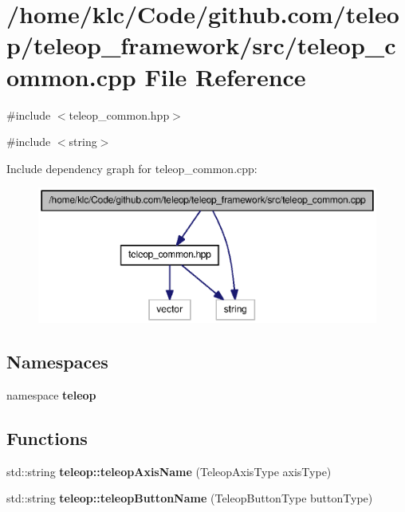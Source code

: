 \section{/home/klc/Code/github.com/teleop/teleop\_\-framework/src/teleop\_\-common.cpp File Reference}
\label{teleop__common_8cpp}
{\ttfamily \#include $<$teleop\_\-common.hpp$>$}\par
{\ttfamily \#include $<$string$>$}\par
Include dependency graph for teleop\_\-common.cpp:
\nopagebreak
\begin{figure}[H]
\begin{center}
\leavevmode
\includegraphics[width=396pt]{teleop__common_8cpp__incl}
\end{center}
\end{figure}
\subsection*{Namespaces}
\begin{DoxyCompactItemize}
\item 
namespace {\bf teleop}
\end{DoxyCompactItemize}
\subsection*{Functions}
\begin{DoxyCompactItemize}
\item 
std::string {\bf teleop::teleopAxisName} (TeleopAxisType axisType)
\item 
std::string {\bf teleop::teleopButtonName} (TeleopButtonType buttonType)
\end{DoxyCompactItemize}

